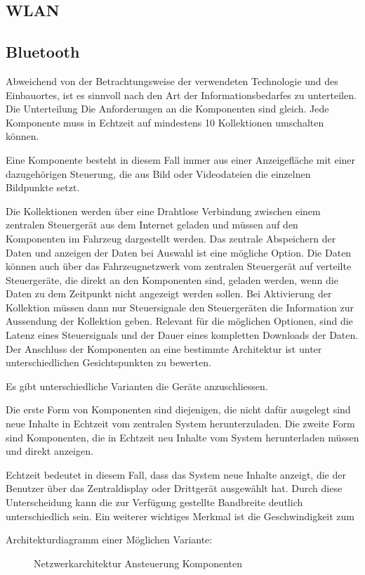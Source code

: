 \subsection{WLAN}
\subsection{Bluetooth}


Abweichend von der Betrachtungsweise der verwendeten Technologie und des Einbauortes, ist es sinnvoll nach den Art der Informationsbedarfes zu unterteilen. Die Unterteilung 
Die Anforderungen an die Komponenten sind gleich. Jede Komponente muss in Echtzeit auf mindestens 10 Kollektionen umschalten können.

Eine Komponente besteht in diesem Fall immer aus einer Anzeigefläche mit einer dazugehörigen Steuerung, die aus Bild oder Videodateien die einzelnen Bildpunkte setzt.

Die Kollektionen werden über eine Drahtlose Verbindung zwischen einem zentralen Steuergerät aus dem Internet geladen und müssen auf den Komponenten im Fahrzeug dargestellt werden. 
Das zentrale Abspeichern der Daten und anzeigen der Daten bei Auswahl ist eine mögliche Option.
Die Daten können auch über das Fahrzeugnetzwerk vom zentralen Steuergerät auf verteilte Steuergeräte, die direkt an den Komponenten sind, geladen werden, wenn die Daten zu dem Zeitpunkt nicht angezeigt werden sollen. Bei Aktivierung der Kollektion müssen dann nur Steuersignale den Steuergeräten die Information zur Aussendung der Kollektion geben.
Relevant für die möglichen Optionen, sind die Latenz eines Steuersignals und der Dauer eines kompletten Downloads der Daten.
Der Anschluss der Komponenten an eine bestimmte Architektur ist unter unterschiedlichen Gesichtspunkten zu bewerten.

Es gibt unterschiedliche Varianten die Geräte anzuschliessen.

Die erste Form von Komponenten sind diejenigen, die nicht dafür ausgelegt sind neue Inhalte in Echtzeit vom zentralen System herunterzuladen.
Die zweite Form sind Komponenten, die in Echtzeit neu Inhalte vom System herunterladen müssen und direkt anzeigen.

Echtzeit bedeutet in diesem Fall, dass das System neue Inhalte anzeigt, die der Benutzer über das Zentraldisplay oder Drittgerät ausgewählt hat.
Durch diese Unterscheidung kann die zur Verfügung gestellte Bandbreite deutlich unterschiedlich sein. 
Ein weiterer wichtiges Merkmal ist die Geschwindigkeit zum 


Architekturdiagramm einer Möglichen Variante:
\begin{figure}[hbt]
	\centering
	
	\caption[Netzwerkarchitektur Ansteuerung Komponenten]{Netzwerkarchitektur Ansteuerung Komponenten}
	\label{fig:architektur1}
\end{figure}
